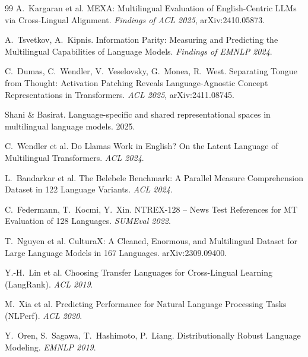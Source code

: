 \documentclass[11pt,a4paper]{article}
\begin{document}
\begin{thebibliography}{99}
A.~Kargaran et al. MEXA: Multilingual Evaluation of English-Centric LLMs via
Cross-Lingual Alignment. \emph{Findings of ACL 2025}, arXiv:2410.05873.

A.~Tsvetkov, A.~Kipnis. Information Parity: Measuring and Predicting the
Multilingual Capabilities of Language Models. \emph{Findings of EMNLP 2024}.

C.~Dumas, C.~Wendler, V.~Veselovsky, G.~Monea, R.~West. Separating Tongue from
Thought: Activation Patching Reveals Language-Agnostic Concept Representations
in Transformers. \emph{ACL 2025}, arXiv:2411.08745.

Shani \& Basirat. Language-specific and shared representational spaces in
multilingual language models. 2025.

C.~Wendler et al. Do Llamas Work in English? On the Latent Language of
Multilingual Transformers. \emph{ACL 2024}.

L.~Bandarkar et al. The Belebele Benchmark: A Parallel Measure Comprehension
Dataset in 122 Language Variants. \emph{ACL 2024}.

C.~Federmann, T.~Kocmi, Y.~Xin. NTREX-128 -- News Test References for MT
Evaluation of 128 Languages. \emph{SUMEval 2022}.

T.~Nguyen et al. CulturaX: A Cleaned, Enormous, and Multilingual Dataset for
Large Language Models in 167 Languages. arXiv:2309.09400.

Y.-H.~Lin et al. Choosing Transfer Languages for Cross-Lingual Learning
(LangRank). \emph{ACL 2019}.

M.~Xia et al. Predicting Performance for Natural Language Processing Tasks
(NLPerf). \emph{ACL 2020}.

Y.~Oren, S.~Sagawa, T.~Hashimoto, P.~Liang. Distributionally Robust Language
Modeling. \emph{EMNLP 2019}.


\end{thebibliography}
\end{document}
